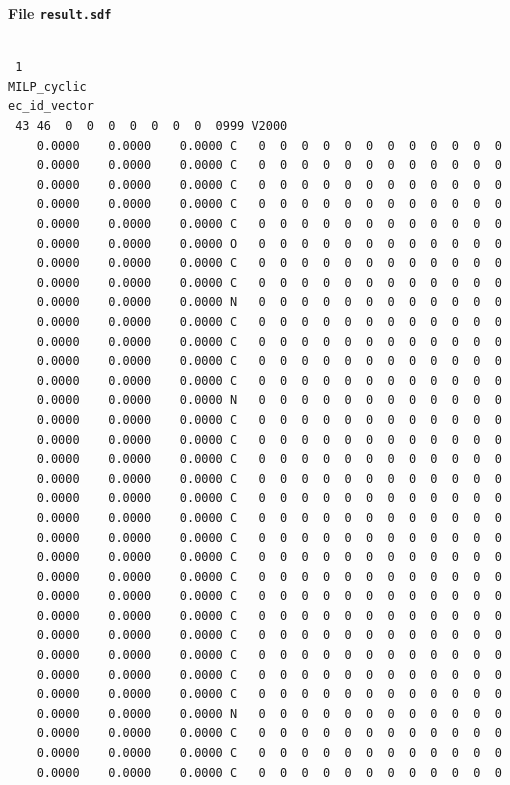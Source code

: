 \documentclass[11pt, titlepage, dvipdfmx, twoside]{article}
\begin{document}
\begin{oframed}
{\bf File {\tt result.sdf}}\\\\
\begin{verbatim}
 1
MILP_cyclic
ec_id_vector
 43 46  0  0  0  0  0  0  0  0999 V2000 
    0.0000    0.0000    0.0000 C   0  0  0  0  0  0  0  0  0  0  0  0
    0.0000    0.0000    0.0000 C   0  0  0  0  0  0  0  0  0  0  0  0
    0.0000    0.0000    0.0000 C   0  0  0  0  0  0  0  0  0  0  0  0
    0.0000    0.0000    0.0000 C   0  0  0  0  0  0  0  0  0  0  0  0
    0.0000    0.0000    0.0000 C   0  0  0  0  0  0  0  0  0  0  0  0
    0.0000    0.0000    0.0000 O   0  0  0  0  0  0  0  0  0  0  0  0
    0.0000    0.0000    0.0000 C   0  0  0  0  0  0  0  0  0  0  0  0
    0.0000    0.0000    0.0000 C   0  0  0  0  0  0  0  0  0  0  0  0
    0.0000    0.0000    0.0000 N   0  0  0  0  0  0  0  0  0  0  0  0
    0.0000    0.0000    0.0000 C   0  0  0  0  0  0  0  0  0  0  0  0
    0.0000    0.0000    0.0000 C   0  0  0  0  0  0  0  0  0  0  0  0
    0.0000    0.0000    0.0000 C   0  0  0  0  0  0  0  0  0  0  0  0
    0.0000    0.0000    0.0000 C   0  0  0  0  0  0  0  0  0  0  0  0
    0.0000    0.0000    0.0000 N   0  0  0  0  0  0  0  0  0  0  0  0
    0.0000    0.0000    0.0000 C   0  0  0  0  0  0  0  0  0  0  0  0
    0.0000    0.0000    0.0000 C   0  0  0  0  0  0  0  0  0  0  0  0
    0.0000    0.0000    0.0000 C   0  0  0  0  0  0  0  0  0  0  0  0
    0.0000    0.0000    0.0000 C   0  0  0  0  0  0  0  0  0  0  0  0
    0.0000    0.0000    0.0000 C   0  0  0  0  0  0  0  0  0  0  0  0
    0.0000    0.0000    0.0000 C   0  0  0  0  0  0  0  0  0  0  0  0
    0.0000    0.0000    0.0000 C   0  0  0  0  0  0  0  0  0  0  0  0
    0.0000    0.0000    0.0000 C   0  0  0  0  0  0  0  0  0  0  0  0
    0.0000    0.0000    0.0000 C   0  0  0  0  0  0  0  0  0  0  0  0
    0.0000    0.0000    0.0000 C   0  0  0  0  0  0  0  0  0  0  0  0
    0.0000    0.0000    0.0000 C   0  0  0  0  0  0  0  0  0  0  0  0
    0.0000    0.0000    0.0000 C   0  0  0  0  0  0  0  0  0  0  0  0
    0.0000    0.0000    0.0000 C   0  0  0  0  0  0  0  0  0  0  0  0
    0.0000    0.0000    0.0000 C   0  0  0  0  0  0  0  0  0  0  0  0
    0.0000    0.0000    0.0000 C   0  0  0  0  0  0  0  0  0  0  0  0
    0.0000    0.0000    0.0000 N   0  0  0  0  0  0  0  0  0  0  0  0
    0.0000    0.0000    0.0000 C   0  0  0  0  0  0  0  0  0  0  0  0
    0.0000    0.0000    0.0000 C   0  0  0  0  0  0  0  0  0  0  0  0
    0.0000    0.0000    0.0000 C   0  0  0  0  0  0  0  0  0  0  0  0

\end{verbatim}
\end{oframed}
\end{document}
